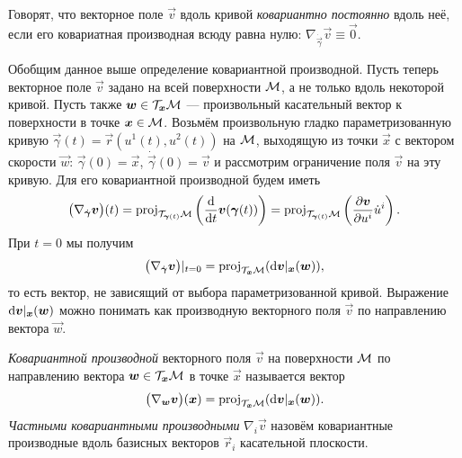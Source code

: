 \begin{definition}
	Говорят, что векторное поле $\vec{v}$ вдоль кривой \textit{ковариантно постоянно} вдоль неё, если его ковариатная производная всюду равна нулю: $\nabla_{\dot{\vec{\gamma}}}\vec{v} \equiv \vec{0}$.
\end{definition}


Обобщим данное выше определение ковариантной производной. Пусть теперь векторное поле $\vec{v}$ задано на всей поверхности $\mathcal{M}$, а не только вдоль некоторой кривой. Пусть также $\boldsymbol{w} \in \mathcal{T}_{\boldsymbol{x}}\mathcal{M}$ --- произвольный касательный вектор к поверхности в точке $\boldsymbol{x} \in \mathcal{M}$. Возьмём произвольную гладко параметризованную кривую $\vec{\gamma}(t) = \vec{r}(u^1(t), u^2(t))$ на $\mathcal{M}$, выходящую из точки $\vec{x}$ с вектором скорости $\vec{w}$: $\vec{\gamma}(0) = \vec{x}$, $\dot{\vec{\gamma}}(0) = \vec{v}$ и рассмотрим ограничение поля $\vec{v}$ на эту кривую. Для его ковариантной производной будем иметь
\[
	\big(\nabla_{\dot{\boldsymbol{\gamma}}}\boldsymbol{v}\big)(t) = \operatorname{proj}_{\mathcal{T}_{\boldsymbol{\gamma}(t)}\mathcal{M}}\left(\frac{\mathop{}\!\mathrm{d}}{\mathop{}\!\mathrm{d} t}\boldsymbol{v}(\boldsymbol{\gamma}(t))\right) = \operatorname{proj}_{\mathcal{T}_{\boldsymbol{\gamma}(t)}\mathcal{M}}\left(\frac{\partial\boldsymbol{v}}{\partial u^i}\dot{u}^i\right).
\]
При $t = 0$ мы получим
\[
	\big(\nabla_{\dot{\boldsymbol{\gamma}}}\boldsymbol{v}\big)|_{t = 0} = \operatorname{proj}_{\mathcal{T}_{\boldsymbol{x}}\mathcal{M}}(\mathop{}\!\mathrm{d}\boldsymbol{v}|_{\boldsymbol{x}}(\boldsymbol{w})),
\]
то есть вектор, не зависящий от выбора параметризованной кривой. Выражение $\mathop{}\!\mathrm{d}\boldsymbol{v}|_{\boldsymbol{x}}(\boldsymbol{w})$ можно понимать как производную векторного поля $\vec{v}$ по направлению вектора $\vec{w}$.

\begin{definition}
	\textit{Ковариантной производной} векторного поля $\vec{v}$ на поверхности $\mathcal{M}$ по направлению вектора $\boldsymbol{w} \in \mathcal{T}_{\boldsymbol{x}}\mathcal{M}$ в точке $\vec{x}$ называется вектор
	\[
		\big(\nabla_{\boldsymbol{w}}\boldsymbol{v}\big)(\boldsymbol{x}) = \operatorname{proj}_{\mathcal{T}_{\boldsymbol{x}}\mathcal{M}}(\mathop{}\!\mathrm{d}\boldsymbol{v}|_{\boldsymbol{x}}(\boldsymbol{w})).
	\]
	\textit{Частными ковариантными производными} $\nabla_i\vec{v}$ назовём ковариантные производные вдоль базисных векторов $\vec{r}_i$ касательной плоскости.
\end{definition}

